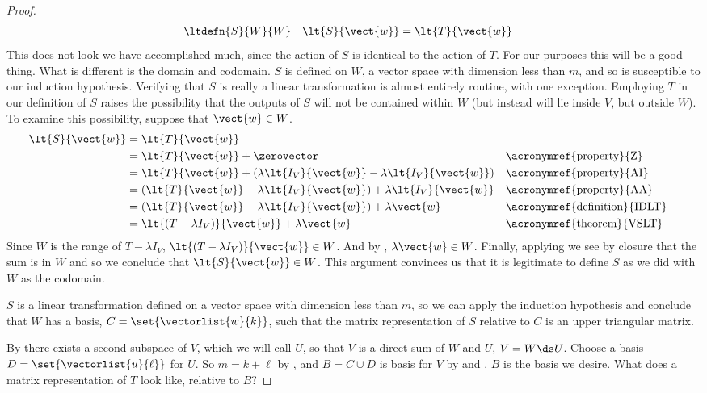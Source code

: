 \begin{proof}
%
\begin{align*}
&\ltdefn{S}{W}{W}
&
\lt{S}{\vect{w}}&=\lt{T}{\vect{w}}
\end{align*}
%
This does not look we have accomplished much, since the action of $S$ is identical to the action of $T$.  For our purposes this will be a good thing.  What is different is the domain and codomain.  $S$ is defined on $W$, a vector space with dimension less than $m$, and so is susceptible to our induction hypothesis.  Verifying that $S$ is really a linear transformation is almost entirely routine, with one exception.  Employing $T$ in our definition of $S$ raises the possibility that the outputs of $S$ will not be contained within $W$ (but instead will lie inside $V$, but outside $W$).  To examine this possibility, suppose that $\vect{w}\in W$.
%
\begin{align*}
\lt{S}{\vect{w}}
&=\lt{T}{\vect{w}}\\
&=\lt{T}{\vect{w}}+\zerovector&&\text{\acronymref{property}{Z}}\\
%
&=\lt{T}{\vect{w}}+\left(\lambda\lt{I_V}{\vect{w}}-\lambda\lt{I_V}{\vect{w}}\right)&&\text{\acronymref{property}{AI}}\\
%
&=\left(\lt{T}{\vect{w}}-\lambda\lt{I_V}{\vect{w}}\right)+\lambda\lt{I_V}{\vect{w}}&&\text{\acronymref{property}{AA}}\\
%
&=\left(\lt{T}{\vect{w}}-\lambda\lt{I_V}{\vect{w}}\right)+\lambda\vect{w}&&\text{\acronymref{definition}{IDLT}}\\
%
&=\lt{\left(T-\lambda I_V\right)}{\vect{w}}+\lambda\vect{w}
&&\text{\acronymref{theorem}{VSLT}}
%
\end{align*}
%
Since $W$ is the range of $T-\lambda I_V$, $\lt{\left(T-\lambda I_V\right)}{\vect{w}}\in W$.  And by , $\lambda\vect{w}\in W$.  Finally, applying  we see by closure that the sum is in $W$ and so we conclude that $\lt{S}{\vect{w}}\in W$.  This argument convinces us that it is legitimate to define $S$ as we did with $W$ as the codomain.\par
%
$S$ is a linear transformation defined on a vector space with dimension less than $m$, so we can apply the induction hypothesis and conclude that $W$ has a basis, $C=\set{\vectorlist{w}{k}}$, such that the matrix representation of $S$ relative to $C$ is an upper triangular matrix.\par
%
By  there exists a second subspace of $V$, which we will call $U$, so that $V$ is a direct sum of $W$ and $U$, $V=W\ds U$.  Choose a basis $D=\set{\vectorlist{u}{\ell}}$ for $U$.  So  $m=k+\ell$ by , and $B=C\cup D$ is basis for $V$ by  and .  $B$ is the basis we desire.  What does a matrix representation of $T$ look like, relative to $B$?\par

\end{proof}
